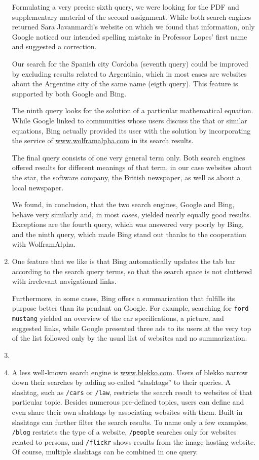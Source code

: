 \documentclass[a4paper,11pt,oneside]{book}
\begin{document}
\begin{enumerate}
				Formulating a very precise sixth query, we were looking for the PDF and supplementary material of the second assignment. While both search engines returned Sara Javanmardi's website on which we found that information, only Google noticed our intended spelling mistake in Professor Lopes' first name and suggested a correction. 
				
				Our search for the Spanish city Cordoba (seventh query) could be improved by excluding results related to Argentinia, which in most cases are websites about the Argentine city of the same name (eigth query). This feature is supported by both Google and Bing.
				
				The ninth query looks for the solution of a particular mathematical equation. While Google linked to communities whose users discuss the that or similar equations, Bing actually provided its user with the solution by incorporating the service of \url{www.wolframalpha.com} in its search results.
				
				The final query consists of one very general term only. Both search engines offered results for different meanings of that term, in our case websites about the star, the software company, the British newspaper, as well as about a local newspaper.
				
				We found, in conclusion, that the two search engines, Google and Bing, behave very similarly and, in most cases, yielded nearly equally good results. Exceptions are the fourth query, which was answered very poorly by Bing, and the ninth query, which made Bing stand out thanks to the cooperation with WolframAlpha.
				
	\item One feature that we like is that Bing automatically updates the tab bar according to the search query  terms, so that the search space is not cluttered with irrelevant navigational links. 
	
		Furthermore, in some cases, Bing offers a summarization that fulfills its purpose better than its pendant on Google. For example, searching for \texttt{ford mustang} yielded an overview of the car specifications, a picture, and suggested links, while Google presented three ads to its users at the very top of the list followed only by the usual list of websites and no summarization.
	\item
	\item A less well-known search engine is \url{www.blekko.com}. Users of blekko narrow down their searches by adding so-called ``slashtags'' to their queries. A slashtag, such as \texttt{/cars} or \texttt{/law}, restricts the search result to websites of that particular topic. Besides numerous pre-defined topics, users can define and even share their own slashtags by associating websites with them. Built-in slashtags can further filter the search results. To name only a few examples, \texttt{/blog} restricts the type of a website, \texttt{/people} searches only for websites related to persons, and \texttt{/flickr} shows results from the image hosting website. Of course, multiple slashtags can be combined in one query.
	

\end{enumerate}
\end{document}
